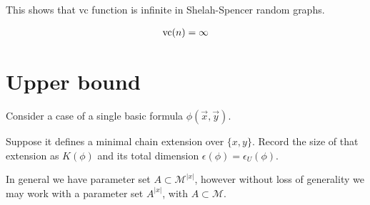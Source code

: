 \documentclass{amsart}
\newcommand{\MM}{\mathscr M}
\begin{document}
This shows that vc function is infinite in Shelah-Spencer random graphs.

\begin{align*}
	\operatorname{vc}(n) = \infty
\end{align*}

\section{Upper bound}





%



Consider a case of a single basic formula $\phi(\vec x, \vec y)$.

Suppose it defines a minimal chain extension over $\{x, y\}$. 
Record the size of that extension as $K(\phi)$ and its total dimension $\epsilon(\phi) = \epsilon_U(\phi)$.

In general we have parameter set $A \subset \MM^{|x|}$, however without loss of generality we may work with
a parameter set $A^{|x|}$, with $A \subset \MM$.
\end{document}
